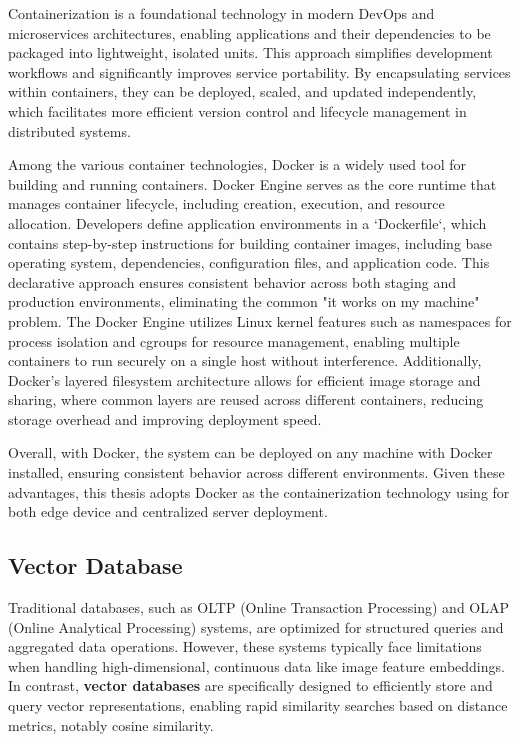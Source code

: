\documentclass[../main.tex]{subfiles}
\begin{document}
Containerization is a foundational technology in modern DevOps and microservices architectures, enabling applications and their dependencies to be packaged into lightweight, isolated units. This approach simplifies development workflows and significantly improves service portability. By encapsulating services within containers, they can be deployed, scaled, and updated independently, which facilitates more efficient version control and lifecycle management in distributed systems.

Among the various container technologies, Docker \cite{docker_intro} is a widely used tool for building and running containers. Docker Engine serves as the core runtime that manages container lifecycle, including creation, execution, and resource allocation. Developers define application environments in a `Dockerfile`, which contains step-by-step instructions for building container images, including base operating system, dependencies, configuration files, and application code. This declarative approach ensures consistent behavior across both staging and production environments, eliminating the common "it works on my machine" problem. The Docker Engine utilizes Linux kernel features such as namespaces for process isolation and cgroups for resource management, enabling multiple containers to run securely on a single host without interference. Additionally, Docker's layered filesystem architecture allows for efficient image storage and sharing, where common layers are reused across different containers, reducing storage overhead and improving deployment speed.

Overall, with Docker, the system can be deployed on any machine with Docker installed, ensuring consistent behavior across different environments. Given these advantages, this thesis adopts Docker as the containerization technology using for both edge device and centralized server deployment.

\subsection{Vector Database}
\label{sec:vector_database}

Traditional databases, such as OLTP (Online Transaction Processing) and OLAP (Online Analytical Processing) systems, are optimized for structured queries and aggregated data operations. However, these systems typically face limitations when handling high-dimensional, continuous data like image feature embeddings. In contrast, \textbf{vector databases} are specifically designed to efficiently store and query vector representations, enabling rapid similarity searches based on distance metrics, notably cosine similarity.
\end{document}

